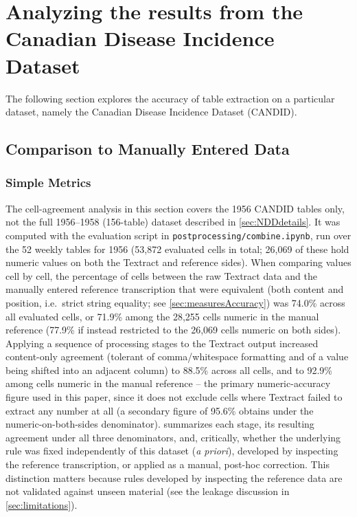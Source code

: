 \documentclass[12pt]{article}
\begin{document}
\section{Analyzing the results from the Canadian Disease Incidence Dataset} \label{sec:NDD}
The following section explores the accuracy of table extraction on a particular dataset, namely the Canadian Disease Incidence Dataset (CANDID). 


\subsection{Comparison to Manually Entered Data}
\subsubsection{Simple Metrics}\label{sec:simple}
The cell-agreement analysis in this section covers the 1956 CANDID tables only, not the full 1956--1958 (156-table) dataset described in \cref{sec:NDDdetails}. It was computed with the evaluation script in \texttt{postprocessing/combine.ipynb}, run over the 52 weekly tables for 1956 (53{,}872 evaluated cells in total; 26{,}069 of these hold numeric values on both the Textract and reference sides). When comparing values cell by cell, the percentage of cells between the raw Textract data and the manually entered reference transcription that were equivalent (both content and position, i.e.\ strict string equality; see \cref{sec:measuresAccuracy}) was 74.0\% across all evaluated cells, or 71.9\% among the 28{,}255 cells numeric in the manual reference (77.9\% if instead restricted to the 26{,}069 cells numeric on both sides). Applying a sequence of processing stages to the Textract output increased content-only agreement (tolerant of comma/whitespace formatting and of a value being shifted into an adjacent column) to 88.5\% across all cells, and to 92.9\% among cells numeric in the manual reference -- the primary numeric-accuracy figure used in this paper, since it does not exclude cells where Textract failed to extract any number at all (a secondary figure of 95.6\% obtains under the numeric-on-both-sides denominator).  summarizes each stage, its resulting agreement under all three denominators, and, critically, whether the underlying rule was fixed independently of this dataset (\emph{a priori}), developed by inspecting the reference transcription, or applied as a manual, post-hoc correction. This distinction matters because rules developed by inspecting the reference data are not validated against unseen material (see the leakage discussion in \cref{sec:limitations}).
\end{document}
